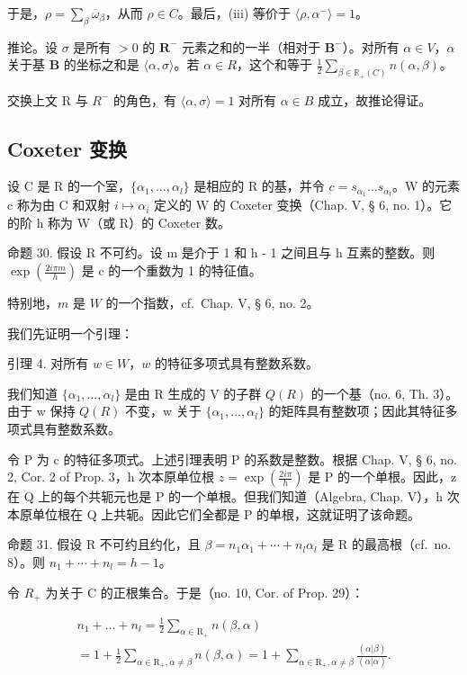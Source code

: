 于是，\(\rho = \sum_{\beta} \overline{\omega}_{\beta}\)，从而 \(\rho \in C\)。最后，(iii) 等价于 \(\langle \rho, \alpha^{-} \rangle = 1\)。

推论。设 \(\sigma\) 是所有 \(>0\) 的 \(\mathbf{R}^{-}\) 元素之和的一半（相对于 \(\mathbf{B}^{-}\)）。对所有 \(\alpha \in V\)，\(\alpha\) 关于基 \(\mathbf{B}\) 的坐标之和是 \(\langle \alpha, \sigma \rangle\)。若 \(\alpha \in R\)，这个和等于 \(\frac{1}{2} \sum_{\beta \in \mathbb{R}_{+}(C)} n(\alpha, \beta)\)。

交换上文 R 与 \(R^{-}\) 的角色，有 \(\langle\alpha,\sigma\rangle=1\) 对所有 \(\alpha\in B\) 成立，故推论得证。

\subsection{Coxeter 变换}

设 C 是 R 的一个室，\(\{\alpha_{1},\ldots,\alpha_{l}\}\) 是相应的 R 的基，并令 \(c=s_{\alpha_{1}}\ldots s_{\alpha_{l}}\)。W 的元素 c 称为由 C 和双射 \(i\mapsto\alpha_{i}\) 定义的 W 的 Coxeter 变换（Chap. V, § 6, no. 1）。它的阶 h 称为 W（或 R）的 Coxeter 数。

命题 30. 假设 R 不可约。设 m 是介于 1 和 h - 1 之间且与 h 互素的整数。则 \(\exp\left(\frac{2i\pi m}{h}\right)\) 是 c 的一个重数为 1 的特征值。

特别地，\(m\) 是 \(W\) 的一个指数，cf.~Chap. V, § 6, no. 2。

我们先证明一个引理：

引理 4. 对所有 \(w \in W\)，\(w\) 的特征多项式具有整数系数。

我们知道 \(\{\alpha_{1},\ldots,\alpha_{l}\}\) 是由 R 生成的 V 的子群 \(Q(R)\) 的一个基（no. 6, Th. 3）。由于 w 保持 \(Q(R)\) 不变，w 关于 \(\{\alpha_{1},\ldots,\alpha_{l}\}\) 的矩阵具有整数项；因此其特征多项式具有整数系数。

令 P 为 c 的特征多项式。上述引理表明 P 的系数是整数。根据 Chap. V, § 6, no. 2, Cor. 2 of Prop. 3，h 次本原单位根 \(z = \exp\left(\frac{2i\pi}{h}\right)\) 是 P 的一个单根。因此，z 在 Q 上的每个共轭元也是 P 的一个单根。但我们知道（Algebra, Chap. V），h 次本原单位根在 Q 上共轭。因此它们全都是 P 的单根，这就证明了该命题。

命题 31. 假设 R 不可约且约化，且 \(\beta = n_{1}\alpha_{1} + \cdots + n_{l}\alpha_{l}\) 是 R 的最高根（cf.~no. 8）。则 \(n_{1} + \cdots + n_{l} = h - 1\)。

令 \(R_{+}\) 为关于 C 的正根集合。于是（no. 10, Cor. of Prop. 29）：

\[
\begin{array}{l} n _ {1} + \dots + n _ {l} = \frac {1}{2} \sum_ {\alpha \in \mathrm{R} _ {+}} n (\beta , \alpha) \\ = 1 + \frac {1}{2} \sum_ {\alpha \in \mathrm{R} _ {+}, \alpha \neq \beta} n (\beta , \alpha) = 1 + \sum_ {\alpha \in \mathrm{R} _ {+}, \alpha \neq \beta} \frac {(\alpha | \beta)}{(\alpha | \alpha)}. \end{array}
\]

